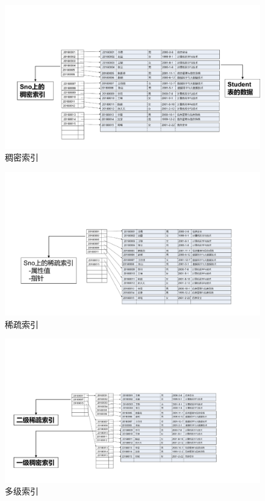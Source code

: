 \documentclass[12pt, oneside]{ctexart}
\numberwithin{figure}{section}
\numberwithin{table}{section}
\begin{document}
\begin{figure}[!htbp]
    \centering
    \includegraphics[width=13cm]{images/sec9/稠密索引.pdf}
    \caption{稠密索引}
    \label{fig:稠密索引}
\end{figure}

\begin{figure}[!htbp]
    \centering
    \includegraphics[width=13cm]{images/sec9/稀疏索引.pdf}
    \caption{稀疏索引}
    \label{fig:稀疏索引}
\end{figure}

\newpage

\begin{figure}[!htbp]
    \centering
    \includegraphics[width=13cm]{images/sec9/多级索引.pdf}
    \caption{多级索引}
    \label{fig:多级索引} 
\end{figure}
\end{document}
